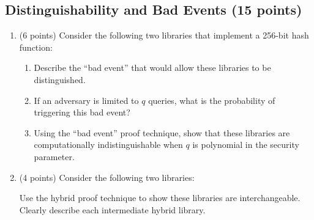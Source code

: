 \documentclass[10pt,a4paper,american]{article}
\begin{document}
\subsection{Distinguishability and Bad Events (15 points)}

\begin{enumerate}
	\item (6 points) Consider the following two libraries that implement a 256-bit hash function:
	      \begin{center}
	      \end{center}

	      \begin{enumerate}
		      \item Describe the ``bad event'' that would allow these libraries to be distinguished.
		      \item If an adversary is limited to $q$ queries, what is the probability of triggering this bad event?
		      \item Using the ``bad event'' proof technique, show that these libraries are computationally indistinguishable when $q$ is polynomial in the security parameter.
	      \end{enumerate}

	\item (4 points) Consider the following two libraries:
	      \begin{center}
	      \end{center}
	      Use the hybrid proof technique to show these libraries are interchangeable. Clearly describe each intermediate hybrid library.


\end{enumerate}
\end{document}
